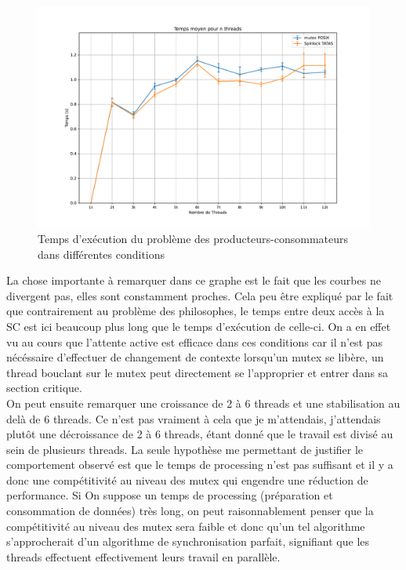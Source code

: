 \begin{figure}[H]
    \centering
    \includegraphics[scale=0.45]{img/prodcons.pdf}
    \caption{Temps d'exécution du problème des producteurs-consommateurs dans différentes conditions}
    \label{pic:prodcons}
\end{figure}

\noindent La chose importante à remarquer dans ce graphe est le fait que les courbes ne divergent pas, elles sont constamment proches. Cela peu être expliqué par le fait que contrairement au problème des philosophes, le temps entre deux accès à la SC est ici beaucoup plus long que le temps d'exécution de celle-ci. On a en effet vu au cours que l'attente active est efficace dans ces conditions car il n'est pas nécéssaire d'effectuer de changement de contexte lorsqu'un mutex se libère, un thread bouclant sur le mutex peut directement se l'approprier et entrer dans sa section critique.\\

\noindent On peut ensuite remarquer une croissance de 2 à 6 threads et une stabilisation au delà de 6 threads. Ce n'est pas vraiment à cela que je m'attendais, j'attendais plutôt une décroissance de 2 à 6 threads, étant donné que le travail est divisé au sein de plusieurs threads. La seule hypothèse me permettant de justifier le comportement observé est que le temps de processing n'est pas suffisant et il y a donc une compétitivité au niveau des mutex qui engendre une réduction de performance. Si On suppose un temps de processing (préparation et consommation de données) très long, on peut raisonnablement penser que la compétitivité au niveau des mutex sera faible et donc qu'un tel algorithme s'approcherait d'un algorithme de synchronisation parfait, signifiant que les threads effectuent effectivement leurs travail en parallèle. \\

